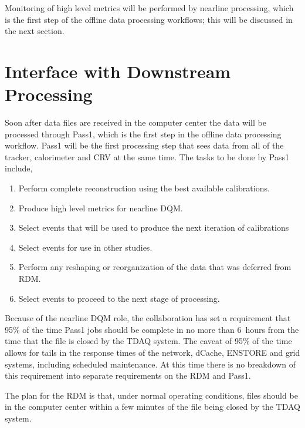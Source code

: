 Monitoring of high level metrics will be performed by nearline processing,
which is the first step of the offline data processing workflows;
this will be discussed in the next section.

\section{Interface with Downstream Processing}
\label{sec:downstreamProcessing}

Soon after data files are received in the computer center the data will be processed
through Pass1, which is the first step in the offline data processing workflow.
Pass1 will be the first processing step that sees data from all of the tracker,
calorimeter and CRV at the same time.  The tasks to be done by Pass1 include,
\begin{enumerate}
  \item Perform complete reconstruction using the best available calibrations.
  \item Produce high level metrics for nearline DQM.
  \item Select events that will be used to produce the next iteration of calibrations
  \item Select events for use in other studies.
  \item Perform any reshaping or reorganization of the data that was deferred from RDM.
  \item Select events to proceed to the next stage of processing. 
\end{enumerate}

Because of the nearline DQM role, the collaboration has set a requirement that
95\% of the time Pass1 jobs should be complete in no more than 6~hours from the
time that the file is closed by the TDAQ system.
The caveat of 95\% of the time allows for tails in the response times of
the network, dCache, ENSTORE and grid systems, including scheduled maintenance.
At this time there is no breakdown of this requirement into separate requirements
on the RDM and Pass1.

The plan for the RDM is that, under normal operating conditions,
files should be in the computer center within a few minutes of the file being closed
by the TDAQ system.


